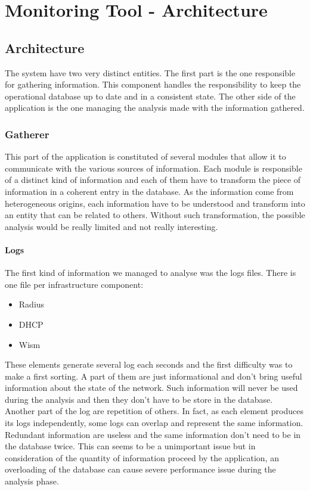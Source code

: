 
\chapter{Monitoring Tool - Architecture} %

\label{Chapter4} %


\section{Architecture}
The system have two very distinct entities. The first part is the one responsible for gathering information. This component handles the responsibility to keep the operational database up to date and in a consistent state. The other side of the application is the one managing the analysis made with the information gathered.

\subsection{Gatherer}
This part of the application is constituted of several modules that allow it to communicate with the various sources of information. Each module is responsible of a distinct kind of information and each of them have to transform the piece of information in a coherent entry in the database. As the information come from heterogeneous origins, each information have to be understood and transform into an entity that can be related to others. Without such transformation, the possible analysis would be really limited and not really interesting.

\subsubsection{Logs}
The first kind of information we managed to analyse was the logs files. There is one file per infrastructure component:
\begin{itemize}
\item Radius
\item DHCP
\item Wism
\end{itemize}
These elements generate several log each seconds and the first difficulty was to make a first sorting. A part of them are just informational and don't bring useful information about the state of the network. Such information will never be used during the analysis and then they don't have to be store in the database. Another part of the log are repetition of others. In fact, as each element produces its logs independently, some logs can overlap and represent the same information. Redundant information are useless and the same information don't need to be in the database twice. This can seems to be a unimportant issue but in consideration of the quantity of information proceed by the application, an overloading of the database can cause severe performance issue during the analysis phase.

